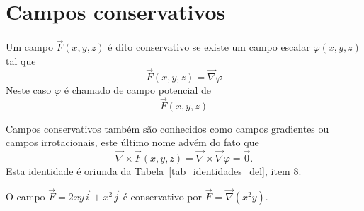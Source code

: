 

\section{Campos conservativos}
\begin{defn} \label{def_campo_conservativo}  Um campo $\vec{F}(x,y,z)$ é dito conservativo se existe um campo escalar $\varphi(x,y,z)$ tal que
$$\vec{F}(x,y,z) = \vec{\nabla}\varphi$$
Neste caso $\varphi$ é chamado de campo potencial de $$\vec{F}(x,y,z)$$
\end{defn}
\begin{obs} Campos conservativos também são conhecidos como campos gradientes ou campos irrotacionais, este último nome advém do fato que $$\vec{\nabla}\times\vec{F}(x,y,z) = \vec{\nabla}\times\vec{\nabla}\varphi=\vec{0}.$$
Esta identidade é oriunda da Tabela~\ref{tab_identidades_del}, item 8.
 \end{obs}
\begin{ex} O campo $\vec{F}=2xy\vec{i}+x^2\vec{j}$ é conservativo por $\vec{F}=\vec{\nabla}\left(x^2y\right)$.
 \end{ex}

